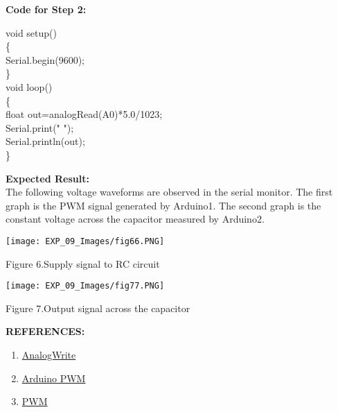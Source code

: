 \documentclass[12pt,a4paper]{article}
\begin{document}
\hspace{2cm}\textbf{\large Code for Step 2:}\\[6pt]


\setlength{\parindent}{10eM}

  void setup() \\
  \{\\
  Serial.begin(9600);\\
\}\\[12pt]

void loop() \\
\{  \\                  
  float out=analogRead(A0)*5.0/1023;\\
    Serial.print(" ");\\
    Serial.println(out);\\

\}
\setlength{\parindent}{0pt}

\begin{justify}
\textbf{Expected Result:}\\
The following voltage waveforms are observed in the serial monitor. The first graph is the PWM signal generated by Arduino1. The second graph is the constant voltage across the capacitor measured by Arduino2.

\begin{center} 
\texttt{[image: EXP\_09\_Images/fig66.PNG]}
\end{center}
\begin{center} {Figure 6.Supply signal to RC circuit}\end{center}

\begin{center} 
\texttt{[image: EXP\_09\_Images/fig77.PNG]}
\end{center}
\begin{center} {Figure 7.Output signal across the capacitor}\end{center}


\textbf{\large REFERENCES:}
\vspace{-6mm}
\begin{enumerate}
\setlength\itemsep{-0.3em}
\item  \href {https://www.arduino.cc/en/Reference/AnalogWrite}{AnalogWrite}
\item  \href {https://www.arduino.cc/en/Tutorial/SecretsOfArduinoPWM}{Arduino PWM}
\item  \href {https://developer.android.com/things/sdk/pio/pwm.html}{PWM}
\end{enumerate}

\end{justify}
\end{document}
